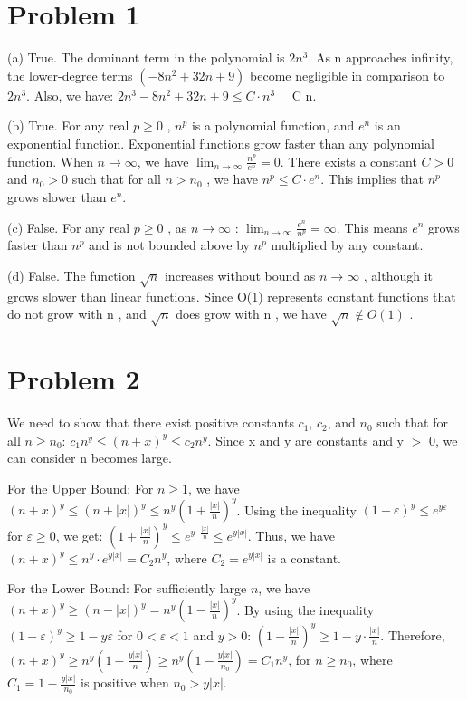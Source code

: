 \documentclass[12 pt]{article}
\begin{document}
\section*{Problem 1}

(a) True. The dominant term in the polynomial is $2n^3$. As n approaches infinity, the lower-degree terms $(-8n^2 + 32n + 9)$ become negligible in comparison to $2n^3$. Also, we have: $2n^3 - 8n^2 + 32n + 9 \leq C \cdot n^3 \quad$  C  n.

(b) True. For any real  $p \geq 0$ ,  $n^p$  is a polynomial function, and  $e^n$  is an exponential function. Exponential functions grow faster than any polynomial function. When $n \to \infty$, we have $\lim_{n \to \infty} \frac{n^p}{e^n} = 0$. There exists a constant  $C > 0$  and  $n_0 > 0$  such that for all  $n > n_0$ , we have  $n^p \leq C \cdot e^n$. This implies that  $n^p$  grows slower than  $e^n$.

(c) False. For any real  $p \geq 0$ , as  $n \to \infty$ :
$\lim_{n \to \infty} \frac{e^n}{n^p} = \infty$. This means  $e^n$  grows faster than  $n^p$  and is not bounded above by  $n^p$  multiplied by any constant.

(d) False. The function  $\sqrt{n}$  increases without bound as  $n \to \infty$ , although it grows slower than linear functions. Since  O(1)  represents constant functions that do not grow with  n , and  $\sqrt{n}$  does grow with  n , we have  $\sqrt{n} \notin O(1)$ .

\vspace{1cm}

\section*{Problem 2}
We need to show that there exist positive constants $c_1$, $c_2$, and $n_0$ such that for all $n \geq n_0$: $c_1 n^y \leq (n + x)^y \leq c_2 n^y$. Since x and y are constants and y $>$ 0, we can consider n becomes large.

For the Upper Bound: For $n \geq 1$, we have $(n + x)^y \leq (n + |x|)^y \leq n^y (1 + \frac{|x|}{n})^y$. Using the inequality $(1 + \varepsilon)^y \leq e^{y\varepsilon}$ for $\varepsilon \geq 0$, we get: $(1 + \frac{|x|}{n})^y \leq e^{y \cdot \frac{|x|}{n}} \leq e^{y|x|}$. Thus, we have $(n + x)^y \leq n^y \cdot e^{y|x|} = C_2 n^y$, where $C_2 = e^{y|x|}$ is a constant.

For the Lower Bound: For sufficiently large $n$, we have $(n + x)^y \geq (n - |x|)^y = n^y \left(1 - \frac{|x|}{n}\right)^y$. By using the inequality $(1 - \varepsilon)^y \geq 1 - y\varepsilon$ for $0 < \varepsilon < 1$ and $y > 0$: $\left(1 - \frac{|x|}{n}\right)^y \geq 1 - y \cdot \frac{|x|}{n}$. Therefore, $(n + x)^y \geq n^y \left(1 - \frac{y|x|}{n}\right) \geq n^y \left(1 - \frac{y|x|}{n_0}\right) = C_1 n^y$, for $n \geq n_0$, where $C_1 = 1 - \frac{y|x|}{n_0}$ is positive when $n_0 > y|x|$.
\end{document}
